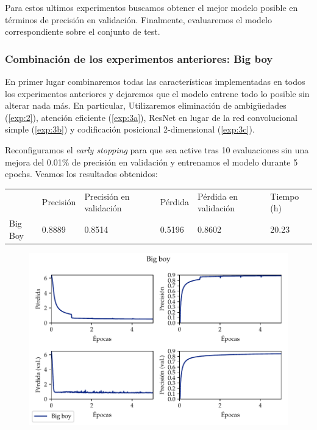 \documentclass[a4paper, 20pt, dvipsnames]{article}
\begin{document}
Para estos ultimos experimentos buscamos obtener el mejor modelo posible en términos
de precisión en validación. Finalmente, evaluaremos el modelo correspondiente sobre el
conjunto de test.

\subsubsection{Combinación de los experimentos anteriores: Big boy}

En primer lugar combinaremos todas las características implementadas en todos los
experimentos anteriores y dejaremos que el modelo entrene todo lo posible sin alterar
nada más. En particular, Utilizaremos eliminación de ambigüedades (\ref{exp:2}),
atención eficiente (\ref{exp:3a}), ResNet en lugar de la red convolucional simple
(\ref{exp:3b}) y codificación posicional 2-dimensional (\ref{exp:3c}). 

Reconfiguramos el \emph{early stopping} para que sea active tras 10 evaluaciones
sin una mejora del 0.01\% de precisión en validación y entrenamos el modelo
durante 5 epochs. Veamos los resultados obtenidos:

\begin{table}[H]
	\centering
	\begin{tabular}{llllll}
		& Precisión & Precisión en validación & Pérdida & Pérdida en validación & Tiempo (h) \\ \cline{2-6} 
		Big Boy & 0.8889    & 0.8514                  & 0.5196  & 0.8602                & 20.23     
	\end{tabular}
\end{table}

\begin{figure}[H]
	\centering
	\includegraphics{fig/bigboy.pdf}
\end{figure}
\end{document}
